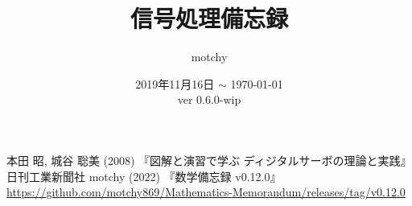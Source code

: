 \documentclass[dvipdfmx,uplatex,report]{jsbook} %
\theoremstyle{definition} %
\def\docVerMajor{0}
\def\docVerMinor{6}
\def\docVerPatch{0}
\def\docVerWip{-wip} %
\def\docVer{\docVerMajor.\docVerMinor.\docVerPatch\docVerWip}
\begin{document}
	\title{信号処理備忘録}
	\author{motchy}
	\date{ 2019年11月16日 $\sim$ \today \\ver \docVer}
	\maketitle
	{\scriptsize \tableofcontents}

	
	
	
	
	
	
	
	
	
	

	\begin{thebibliography}{9}
		本田 昭, 城谷 聡美 (2008) 『図解と演習で学ぶ ディジタルサーボの理論と実践』日刊工業新聞社
		motchy (2022) 『数学備忘録 v0.12.0』\url{https://github.com/motchy869/Mathematics-Memorandum/releases/tag/v0.12.0}
	\end{thebibliography}
\end{document}

